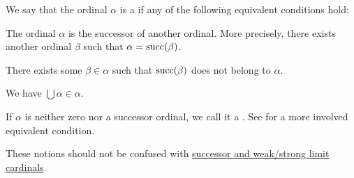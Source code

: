 \begin{definition}\label{def:successor_and_limit_ordinal}
  We say that the ordinal \( \alpha \) is a  if any of the following equivalent conditions hold:

  \begin{thmenum}
     The ordinal \( \alpha \) is the successor of another ordinal. More precisely, there exists another ordinal \( \beta \) such that \( \alpha = \operatorname{succ}(\beta) \).

     There exists some \( \beta \in \alpha \) such that \( \operatorname{succ}(\beta) \) does not belong to \( \alpha \).

     We have \( \bigcup \alpha \in \alpha \).
  \end{thmenum}

  If \( \alpha \) is neither zero nor a successor ordinal, we call it a . See  for a more involved equivalent condition.

  These notions should not be confused with \hyperref[def:successor_and_limit_cardinal]{successor and weak/strong limit cardinals}.
\end{definition}

